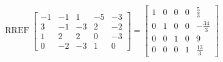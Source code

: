 \begin{exerciseAnswer} 


\[\operatorname{RREF} \left[\begin{array}{ccccc}
-1 & -1 & 1 & -5 & -3 \\
3 & -1 & -3 & 2 & -2 \\
1 & 2 & 2 & 0 & -3 \\
0 & -2 & -3 & 1 & 0
\end{array}\right] = \left[\begin{array}{ccccc}
1 & 0 & 0 & 0 & \frac{5}{3} \\
0 & 1 & 0 & 0 & -\frac{34}{3} \\
0 & 0 & 1 & 0 & 9 \\
0 & 0 & 0 & 1 & \frac{13}{3}
\end{array}\right] \]



\end{exerciseAnswer}
